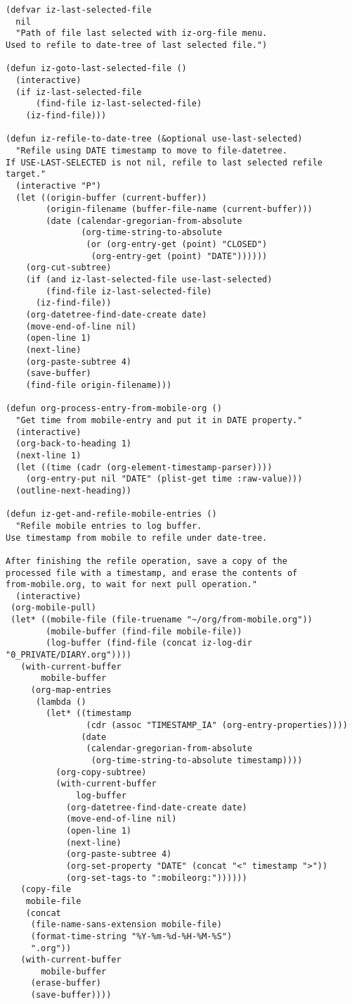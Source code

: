 \documentclass{article}
\begin{document}
\begin{verbatim}
(defvar iz-last-selected-file
  nil
  "Path of file last selected with iz-org-file menu.
Used to refile to date-tree of last selected file.")

(defun iz-goto-last-selected-file ()
  (interactive)
  (if iz-last-selected-file
      (find-file iz-last-selected-file)
    (iz-find-file)))

(defun iz-refile-to-date-tree (&optional use-last-selected)
  "Refile using DATE timestamp to move to file-datetree.
If USE-LAST-SELECTED is not nil, refile to last selected refile target."
  (interactive "P")
  (let ((origin-buffer (current-buffer))
        (origin-filename (buffer-file-name (current-buffer)))
        (date (calendar-gregorian-from-absolute
               (org-time-string-to-absolute
                (or (org-entry-get (point) "CLOSED")
                 (org-entry-get (point) "DATE"))))))
    (org-cut-subtree)
    (if (and iz-last-selected-file use-last-selected)
        (find-file iz-last-selected-file)
      (iz-find-file))
    (org-datetree-find-date-create date)
    (move-end-of-line nil)
    (open-line 1)
    (next-line)
    (org-paste-subtree 4)
    (save-buffer)
    (find-file origin-filename)))

(defun org-process-entry-from-mobile-org ()
  "Get time from mobile-entry and put it in DATE property."
  (interactive)
  (org-back-to-heading 1)
  (next-line 1)
  (let ((time (cadr (org-element-timestamp-parser))))
    (org-entry-put nil "DATE" (plist-get time :raw-value)))
  (outline-next-heading))

(defun iz-get-and-refile-mobile-entries ()
  "Refile mobile entries to log buffer.
Use timestamp from mobile to refile under date-tree.

After finishing the refile operation, save a copy of the
processed file with a timestamp, and erase the contents of
from-mobile.org, to wait for next pull operation."
  (interactive)
 (org-mobile-pull)
 (let* ((mobile-file (file-truename "~/org/from-mobile.org"))
        (mobile-buffer (find-file mobile-file))
        (log-buffer (find-file (concat iz-log-dir "0_PRIVATE/DIARY.org"))))
   (with-current-buffer
       mobile-buffer
     (org-map-entries
      (lambda ()
        (let* ((timestamp
                (cdr (assoc "TIMESTAMP_IA" (org-entry-properties))))
               (date
                (calendar-gregorian-from-absolute
                 (org-time-string-to-absolute timestamp))))
          (org-copy-subtree)
          (with-current-buffer
              log-buffer
            (org-datetree-find-date-create date)
            (move-end-of-line nil)
            (open-line 1)
            (next-line)
            (org-paste-subtree 4)
            (org-set-property "DATE" (concat "<" timestamp ">"))
            (org-set-tags-to ":mobileorg:"))))))
   (copy-file
    mobile-file
    (concat
     (file-name-sans-extension mobile-file)
     (format-time-string "%Y-%m-%d-%H-%M-%S")
     ".org"))
   (with-current-buffer
       mobile-buffer
     (erase-buffer)
     (save-buffer))))


\end{verbatim}
\end{document}
